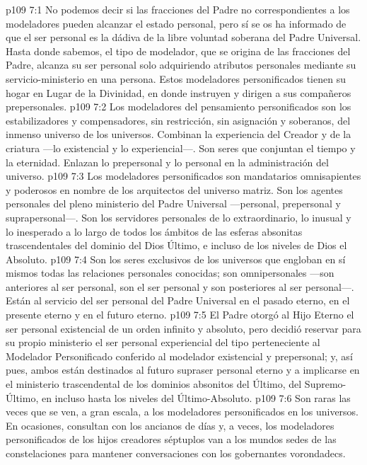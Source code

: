 \vs p109 7:1 No podemos decir si las fracciones del Padre no correspondientes a los modeladores pueden alcanzar el estado personal, pero sí se os ha informado de que el ser personal es la dádiva de la libre voluntad soberana del Padre Universal. Hasta donde sabemos, el tipo de modelador, que se origina de las fracciones del Padre, alcanza su ser personal solo adquiriendo atributos personales mediante su servicio\hyp{}ministerio en una persona. Estos modeladores personificados tienen su hogar en Lugar de la Divinidad, en donde instruyen y dirigen a sus compañeros prepersonales.
\vs p109 7:2 Los modeladores del pensamiento personificados son los estabilizadores y compensadores, sin restricción, sin asignación y soberanos, del inmenso universo de los universos. Combinan la experiencia del Creador y de la criatura ---lo existencial y lo experiencial---. Son seres que conjuntan el tiempo y la eternidad. Enlazan lo prepersonal y lo personal en la administración del universo.
\vs p109 7:3 Los modeladores personificados son mandatarios omnisapientes y poderosos en nombre de los arquitectos del universo matriz. Son los agentes personales del pleno ministerio del Padre Universal ---personal, prepersonal y suprapersonal---. Son los servidores personales de lo extraordinario, lo inusual y lo inesperado a lo largo de todos los ámbitos de las esferas absonitas trascendentales del dominio del Dios Último, e incluso de los niveles de Dios el Absoluto.
\vs p109 7:4 Son los seres exclusivos de los universos que engloban en sí mismos todas las relaciones personales conocidas; son omnipersonales ---son anteriores al ser personal, son el ser personal y son posteriores al ser personal---. Están al servicio del ser personal del Padre Universal en el pasado eterno, en el presente eterno y en el futuro eterno.
\vs p109 7:5 El Padre otorgó al Hijo Eterno el ser personal existencial de un orden infinito y absoluto, pero decidió reservar para su propio ministerio el ser personal experiencial del tipo perteneciente al Modelador Personificado conferido al modelador existencial y prepersonal; y, así pues, ambos están destinados al futuro supraser personal eterno y a implicarse en el ministerio trascendental de los dominios absonitos del Último, del Supremo\hyp{}Último, en incluso hasta los niveles del Último\hyp{}Absoluto.
\vs p109 7:6 Son raras las veces que se ven, a gran escala, a los modeladores personificados en los universos. En ocasiones, consultan con los ancianos de días y, a veces, los modeladores personificados de los hijos creadores séptuplos van a los mundos sedes de las constelaciones para mantener conversaciones con los gobernantes vorondadecs.

